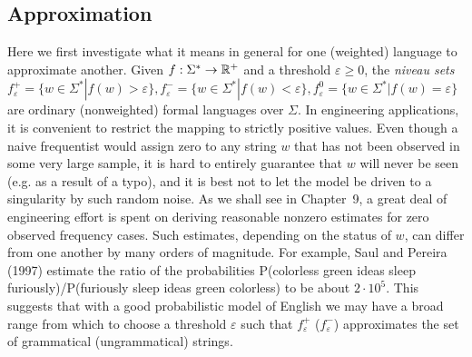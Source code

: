 \subsection{Approximation}

Here we first investigate what it means in general for one (weighted) language
to approximate another. Given $f: \Sigma^* \rightarrow {\Bbb R}^+$ and a
threshold $\varepsilon \geq 0$, the {\it niveau sets} $f_{\varepsilon}^+ = \{w
\in \Sigma^* | f(w) > \varepsilon\}, f_{\varepsilon}^- = \{w \in \Sigma^* |
f(w) < \varepsilon\}, f_{\varepsilon}^0 = \{w \in \Sigma^* | f(w) =
\varepsilon\}$ are ordinary (nonweighted) formal languages over $\Sigma$.  In
engineering applications, it is convenient to restrict the mapping to strictly
positive values. Even though a naive frequentist would assign zero to any
string $w$ that has not been observed in some very large sample, it is hard to
entirely guarantee that $w$ will never be seen (e.g. as a result of a typo),
and it is best not to let the model be driven to a singularity by such random
noise. As we shall see in Chapter~9, a great deal of engineering effort is
spent on deriving reasonable nonzero estimates for zero observed frequency
cases. Such estimates, depending on the status of $w$, can differ from one
another by many orders of magnitude. For example, Saul and Pereira
(1997)\nocite{Saul:1997} estimate the ratio of the probabilities P(colorless
green ideas sleep furiously)/P(furiously sleep ideas green colorless) to be
about $2 \cdot 10^5$. This suggests that with a good probabilistic model of
English we may have a broad range from which to choose a threshold
$\varepsilon$ such that $f_\varepsilon^+$ ($f_{\varepsilon}^-$) approximates
the set of grammatical (ungrammatical) strings.

